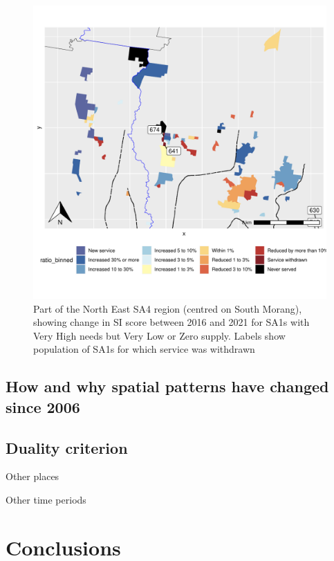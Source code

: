 \documentclass[preprint, 3p,
authoryear]{elsarticle} %
\begin{document}
\begin{figure}
\centering
\includegraphics{ReynoldsCurrieQu2024_files/figure-latex/north_east_changes-1.pdf}
\caption{Part of the North East SA4 region (centred on South Morang),
showing change in SI score between 2016 and 2021 for SA1s with Very High
needs but Very Low or Zero supply. Labels show population of SA1s for
which service was withdrawn}
\end{figure}

\subsection{How and why spatial patterns have changed since
2006}\label{how-and-why-spatial-patterns-have-changed-since-2006}

\subsection{Duality criterion}\label{duality-criterion}

Other places

Other time periods

\section{Conclusions}\label{conclusions}
\end{document}
